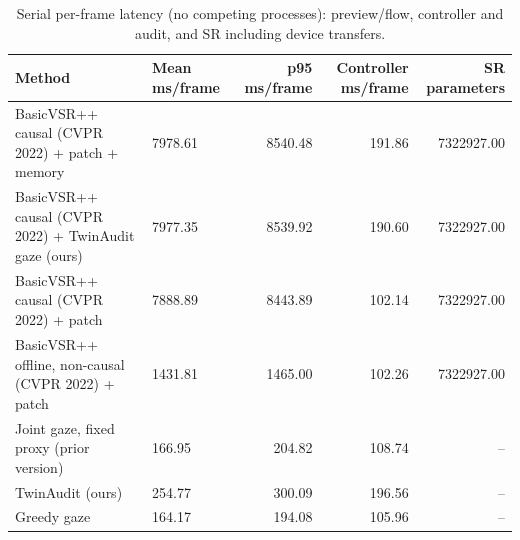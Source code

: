 \begin{table}[t]
\centering
\caption{Serial per-frame latency (no competing processes): preview/flow, controller and audit, and SR including device transfers.}
\label{tab:latency}
\small
\begin{tabular}{llrrr}
\toprule
Method & Mean ms/frame & p95 ms/frame & Controller ms/frame & SR parameters \\
\midrule
BasicVSR++ causal (CVPR 2022) + patch + memory & 7978.61 & 8540.48 & 191.86 & 7322927.00 \\
BasicVSR++ causal (CVPR 2022) + TwinAudit gaze (ours) & 7977.35 & 8539.92 & 190.60 & 7322927.00 \\
BasicVSR++ causal (CVPR 2022) + patch & 7888.89 & 8443.89 & 102.14 & 7322927.00 \\
BasicVSR++ offline, non-causal (CVPR 2022) + patch & 1431.81 & 1465.00 & 102.26 & 7322927.00 \\
Joint gaze, fixed proxy (prior version) & 166.95 & 204.82 & 108.74 & -- \\
TwinAudit (ours) & 254.77 & 300.09 & 196.56 & -- \\
Greedy gaze & 164.17 & 194.08 & 105.96 & -- \\
\bottomrule
\end{tabular}
\end{table}
